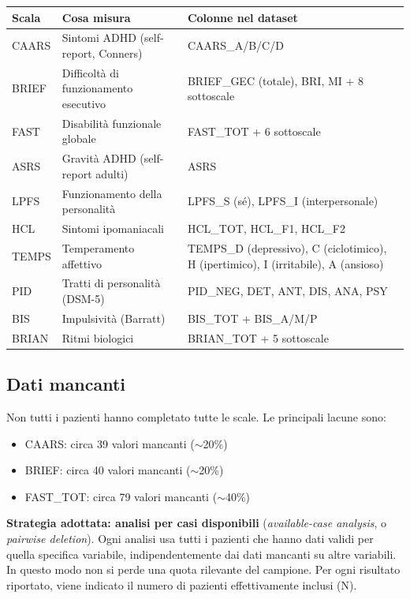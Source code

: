 \documentclass[12pt, a4paper]{article}
\begin{document}
\begin{center}
\begin{longtable}{lp{5.5cm}p{4cm}}
\toprule
\textbf{Scala} & \textbf{Cosa misura} & \textbf{Colonne nel dataset} \\
\midrule
CAARS & Sintomi ADHD (self-report, Conners) & CAARS\_A/B/C/D \\
BRIEF & Difficoltà di funzionamento esecutivo & BRIEF\_GEC (totale), BRI, MI + 8 sottoscale \\
FAST & Disabilità funzionale globale & FAST\_TOT + 6 sottoscale \\
ASRS & Gravità ADHD (self-report adulti) & ASRS \\
LPFS & Funzionamento della personalità & LPFS\_S (sé), LPFS\_I (interpersonale) \\
HCL & Sintomi ipomaniacali & HCL\_TOT, HCL\_F1, HCL\_F2 \\
TEMPS & Temperamento affettivo & TEMPS\_D (depressivo), C (ciclotimico), H (ipertimico), I (irritabile), A (ansioso) \\
PID & Tratti di personalità (DSM-5) & PID\_NEG, DET, ANT, DIS, ANA, PSY \\
BIS & Impulsività (Barratt) & BIS\_TOT + BIS\_A/M/P \\
BRIAN & Ritmi biologici & BRIAN\_TOT + 5 sottoscale \\
\bottomrule
\end{longtable}
\end{center}

\subsection{Dati mancanti}

Non tutti i pazienti hanno completato tutte le scale. Le principali lacune sono:

\begin{itemize}
    \item CAARS: circa 39 valori mancanti ($\sim$20\%)
    \item BRIEF: circa 40 valori mancanti ($\sim$20\%)
    \item FAST\_TOT: circa 79 valori mancanti ($\sim$40\%)
\end{itemize}

\textbf{Strategia adottata: analisi per casi disponibili} (\textit{available-case analysis},
o \textit{pairwise deletion}). Ogni analisi usa tutti i pazienti che hanno dati validi per
quella specifica variabile, indipendentemente dai dati mancanti su altre variabili. In questo
modo non si perde una quota rilevante del campione. Per ogni risultato riportato, viene
indicato il numero di pazienti effettivamente inclusi (N).
\end{document}
